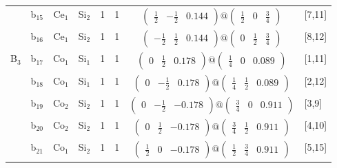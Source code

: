 \documentclass[fleqn,10pt,landscape]{article}
\begin{document}
\begin{itemize}
\begin{center}
\begin{longtable}{cc|cc|c|c|c|l}
& b$_{15}$ & Ce$_{1}$ & Si$_{2}$ & 1 & 1 & $\begin{pmatrix} \frac{1}{2} & - \frac{1}{2} & 0.144 \end{pmatrix}@\begin{pmatrix} \frac{1}{2} & 0 & \frac{3}{4} \end{pmatrix}$ & [7,11] \\
& b$_{16}$ & Ce$_{1}$ & Si$_{2}$ & 1 & 1 & $\begin{pmatrix} - \frac{1}{2} & \frac{1}{2} & 0.144 \end{pmatrix}@\begin{pmatrix} 0 & \frac{1}{2} & \frac{3}{4} \end{pmatrix}$ & [8,12] \\ \hline
B$_{3}$ & b$_{17}$ & Co$_{1}$ & Si$_{1}$ & 1 & 1 & $\begin{pmatrix} 0 & \frac{1}{2} & 0.178 \end{pmatrix}@\begin{pmatrix} \frac{1}{4} & 0 & 0.089 \end{pmatrix}$ & [1,11] \\
& b$_{18}$ & Co$_{1}$ & Si$_{1}$ & 1 & 1 & $\begin{pmatrix} 0 & - \frac{1}{2} & 0.178 \end{pmatrix}@\begin{pmatrix} \frac{1}{4} & \frac{1}{2} & 0.089 \end{pmatrix}$ & [2,12] \\
& b$_{19}$ & Co$_{2}$ & Si$_{2}$ & 1 & 1 & $\begin{pmatrix} 0 & - \frac{1}{2} & -0.178 \end{pmatrix}@\begin{pmatrix} \frac{3}{4} & 0 & 0.911 \end{pmatrix}$ & [3,9] \\
& b$_{20}$ & Co$_{2}$ & Si$_{2}$ & 1 & 1 & $\begin{pmatrix} 0 & \frac{1}{2} & -0.178 \end{pmatrix}@\begin{pmatrix} \frac{3}{4} & \frac{1}{2} & 0.911 \end{pmatrix}$ & [4,10] \\
& b$_{21}$ & Co$_{1}$ & Si$_{2}$ & 1 & 1 & $\begin{pmatrix} \frac{1}{2} & 0 & -0.178 \end{pmatrix}@\begin{pmatrix} \frac{1}{2} & \frac{3}{4} & 0.911 \end{pmatrix}$ & [5,15] \\

\end{longtable}
\end{center}
\end{itemize}
\end{document}
